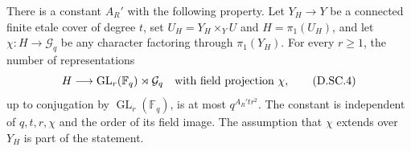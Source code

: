 \begin{theorem}
\label{D:etale-resolution-semilinear-count}
There is a constant $A_R'$ with the following property.
Let $Y_H\to Y$ be a connected finite etale cover of degree
$t$, set $U_H=Y_H\times_Y U$ and $H=\pi_1(U_H)$, and
let $\chi:H\to\mathcal G_q$ be any character factoring
through $\pi_1(Y_H)$. For every $r\geq1$, the number of
representations
\[
 H\longrightarrow\operatorname{GL}_r(\mathbb F_q)
                         \rtimes\mathcal G_q
 \quad\hbox{with field projection }\chi,
                                                        \tag{D.SC.4}
\]
up to conjugation by $\operatorname{GL}_r(\mathbb F_q)$,
is at most $q^{A_R'tr^2}$. The constant is independent of
$q,t,r,\chi$ and the order of its field image. The assumption
that $\chi$ extends over $Y_H$ is part of the statement.
\end{theorem}

